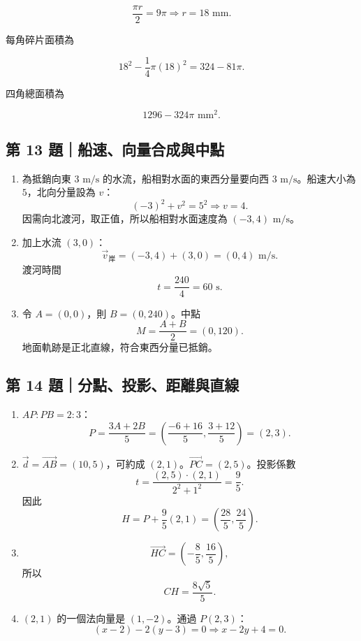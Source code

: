 \documentclass[11pt,a4paper]{article}
\providecommand{\tightlist}{%
  \setlength{\itemsep}{0pt}\setlength{\parskip}{0pt}}
\begin{document}
\[
\frac{\pi r}{2}=9\pi\Rightarrow r=18\text{ mm}.
\]

每角碎片面積為

\[
18^2-\frac14\pi(18)^2=324-81\pi.
\]

四角總面積為

\[
1296-324\pi\text{ mm}^2.
\]

\subsection{第 13 題｜船速、向量合成與中點}\label{ux7b2c-13-ux984cux8239ux901fux5411ux91cfux5408ux6210ux8207ux4e2dux9ede}

\begin{enumerate}
\def\labelenumi{\arabic{enumi}.}
\tightlist
\item
  為抵銷向東 \(3\text{ m/s}\) 的水流，船相對水面的東西分量要向西 \(3\text{ m/s}\)。船速大小為 \(5\)，北向分量設為 \(v\)：
  \[
  (-3)^2+v^2=5^2\Rightarrow v=4.
  \]
  因需向北渡河，取正值，所以船相對水面速度為 \((-3,4)\text{ m/s}\)。
\item
  加上水流 \((3,0)\)：
  \[
  \vec v_{\text{岸}}=(-3,4)+(3,0)=(0,4)\text{ m/s}.
  \]
  渡河時間
  \[
  t=\frac{240}{4}=60\text{ s}.
  \]
\item
  令 \(A=(0,0)\)，則 \(B=(0,240)\)。中點
  \[
  M=\frac{A+B}{2}=(0,120).
  \]
  地面軌跡是正北直線，符合東西分量已抵銷。
\end{enumerate}

\subsection{第 14 題｜分點、投影、距離與直線}\label{ux7b2c-14-ux984cux5206ux9edeux6295ux5f71ux8dddux96e2ux8207ux76f4ux7dda}

\begin{enumerate}
\def\labelenumi{\arabic{enumi}.}
\tightlist
\item
  \(AP:PB=2:3\)：
  \[
  P=\frac{3A+2B}{5}
  =\left(\frac{-6+16}{5},\frac{3+12}{5}\right)=(2,3).
  \]
\item
  \(\vec d=\overrightarrow{AB}=(10,5)\)，可約成 \((2,1)\)。\(\overrightarrow{PC}=(2,5)\)。投影係數
  \[
  t=\frac{(2,5)\cdot(2,1)}{2^2+1^2}=\frac95.
  \]
  因此
  \[
  H=P+\frac95(2,1)=\left(\frac{28}{5},\frac{24}{5}\right).
  \]
\item
  \[
  \overrightarrow{HC}
  =\left(-\frac85,\frac{16}{5}\right),
  \]
  所以
  \[
  CH=\frac{8\sqrt5}{5}.
  \]
\item
  \((2,1)\) 的一個法向量是 \((1,-2)\)。通過 \(P(2,3)\)：
  \[
  (x-2)-2(y-3)=0
  \Rightarrow x-2y+4=0.
  \]
\end{enumerate}
\end{document}
